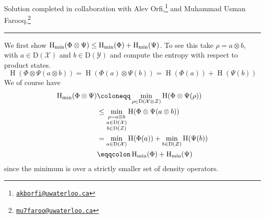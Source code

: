 \documentclass[boxes,pages,color=SeaGreen]{homework}
\newcommand{\collab}[1]{\footnote{\href{mailto:#1}{\texttt{#1}}}}
\renewcommand{\op}[1]{\operatorname{#1}}
\newcommand{\X}{\mathcal{X}}
\newcommand{\Y}{\mathcal{Y}}
\newcommand{\Z}{\mathcal{Z}}
\newcommand{\Density}{\mathrm{D}}
\begin{document}
\noindent Solution completed in collaboration with Alev Orfi,\collab{akborfi@uwaterloo.ca} and Muhammad Usman Farooq.\collab{mu7faroo@uwaterloo.ca}

{\noindent\color{SeaGreen!30}\rule{\textwidth}{1.5pt}}

\begin{solution}
  We first show $\op{H}_{\text{min}}(\Phi\otimes\Psi) \leq \op{H}_{\text{min}}(\Phi) + \op{H}_{\textup{min}}(\Psi)$.
  To see this take $\rho = a \otimes b$, with $a\in\Density(\X)$ and $b\in\Density(\Y)$ and compute the entropy with respect to product states.
  \begin{equation*}
    \op{H}(\Phi\otimes\Psi(a\otimes b)) = \op{H}(\Phi(a)\otimes\Psi(b)) = \op{H}(\Phi(a)) + \op{H}(\Psi(b))
  \end{equation*}
  We of course have
  \begin{align*}
    \op{H}_\text{min}(\Phi\otimes\Psi) & \defeq \min_{\rho\in\Density(\X\otimes\Z)}\op{H}(\Phi\otimes\Psi(\rho))           \\
                                       & \leq \min_{\substack{\rho = a \otimes b                                           \\ a\in\Density(\X) \\ b\in\Density(\Z)}}\op{H}(\Phi\otimes\Psi(a\otimes b)) \\
                                       & = \min_{a\in\Density(\X)}\op{H}(\Phi(a)) + \min_{b\in\Density(\Z)}\op{H}(\Psi(b)) \\
                                       & \eqdef \op{H}_\text{min}(\Phi) + \op{H}_\text{min}(\Psi)
  \end{align*}
  since the minimum is over a strictly smaller set of density operators.


\end{solution}
\end{document}
